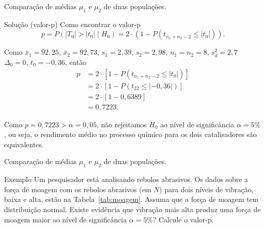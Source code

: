 \documentclass[9pt]{beamer}
\begin{document}
\begin{frame}{Comparação de médias $\mu_1$ e $\mu_2$ de duas populações.}

\begin{block}{Solução (valor-p)}
	Como encontrar o valor-p
	$$p=P(\lvert T_0 \rvert > \lvert t_0 \rvert  \mid H_0) = 2 \cdot(1- P(t_{n_1+n_2-2} \leq \lvert t_0 \rvert)).$$
	
	 Como $\bar{x}_1=92,25$, $\bar{x}_2 = 92,73$, $s_1=2,39$, $s_2=2,98$, $n_1=n_2=8$, $s_d^2=2,7$ $\Delta_0=0$, $t_0=-0,36$, então
	 \begin{align*}
		 p &= 2 \cdot [1 - P(t_{n_1+n_2-2} \leq \lvert t_0 \rvert)]\\
		 &= 2 \cdot [1 - P(t_{22} \leq \lvert -0,36 \rvert)]\\
		 &= 2 \cdot [1 - 0,6389]\\
		 &= 0,7223.
	 \end{align*}
	 
	 Como $p=0,7223 > \alpha = 0,05$, não rejeitamos $H_0$ ao nível de significância $\alpha=5\%$, ou seja, o rendimento médio no processo químico para os dois catalisadores são equivalentes.
\end{block}

\end{frame}

\begin{frame}{Comparação de médias $\mu_1$ e $\mu_2$ de duas populações.}
	\begin{block}{Exemplo}
			Um pesquisador está analisando rebolos abrasivos. Os dados sobre a força de moagem com os rebolos abrasivos (em $N$) para dois níveis de vibração, baixa e alta, estão na Tabela~\ref{tab:moagem}. Assuma que a força de moagem tem distribuição normal. Existe evidência que vibração mais alta produz uma força de moagem maior ao nível de significância $\alpha=5\%$? Calcule o valor-p.
			\begin{table}[ht]
				\centering
				\caption{Força de moagem para níveis baixos e altos de vibração.} 
				\label{tab:moagem}
			\end{table}
	\end{block}
\end{frame}
\end{document}
